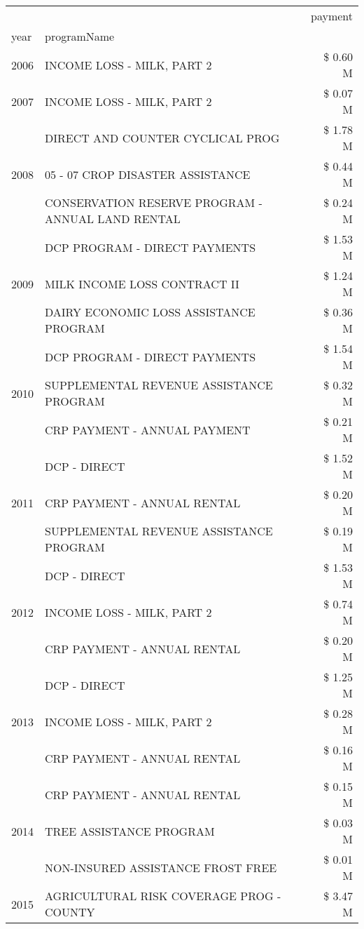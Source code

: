 \begin{tabular}{llr}
\toprule
 &  & payment \\
year & programName &  \\
\midrule
2006 & INCOME LOSS - MILK, PART 2 & \$ 0.60 M \\
\cline{1-3}
2007 & INCOME LOSS - MILK, PART 2 & \$ 0.07 M \\
\cline{1-3}
\multirow[t]{3}{*}{2008} & DIRECT AND COUNTER CYCLICAL PROG & \$ 1.78 M \\
 & 05 - 07 CROP DISASTER ASSISTANCE & \$ 0.44 M \\
 & CONSERVATION RESERVE PROGRAM - ANNUAL LAND RENTAL & \$ 0.24 M \\
\cline{1-3}
\multirow[t]{3}{*}{2009} & DCP PROGRAM - DIRECT PAYMENTS & \$ 1.53 M \\
 & MILK INCOME LOSS CONTRACT II & \$ 1.24 M \\
 & DAIRY ECONOMIC LOSS ASSISTANCE PROGRAM & \$ 0.36 M \\
\cline{1-3}
\multirow[t]{3}{*}{2010} & DCP PROGRAM - DIRECT PAYMENTS & \$ 1.54 M \\
 & SUPPLEMENTAL REVENUE ASSISTANCE PROGRAM & \$ 0.32 M \\
 & CRP PAYMENT - ANNUAL PAYMENT & \$ 0.21 M \\
\cline{1-3}
\multirow[t]{3}{*}{2011} & DCP - DIRECT & \$ 1.52 M \\
 & CRP PAYMENT - ANNUAL RENTAL & \$ 0.20 M \\
 & SUPPLEMENTAL REVENUE ASSISTANCE PROGRAM & \$ 0.19 M \\
\cline{1-3}
\multirow[t]{3}{*}{2012} & DCP - DIRECT & \$ 1.53 M \\
 & INCOME LOSS - MILK, PART 2 & \$ 0.74 M \\
 & CRP PAYMENT - ANNUAL RENTAL & \$ 0.20 M \\
\cline{1-3}
\multirow[t]{3}{*}{2013} & DCP - DIRECT & \$ 1.25 M \\
 & INCOME LOSS - MILK, PART 2 & \$ 0.28 M \\
 & CRP PAYMENT - ANNUAL RENTAL & \$ 0.16 M \\
\cline{1-3}
\multirow[t]{3}{*}{2014} & CRP PAYMENT - ANNUAL RENTAL & \$ 0.15 M \\
 & TREE ASSISTANCE PROGRAM & \$ 0.03 M \\
 & NON-INSURED ASSISTANCE FROST FREE & \$ 0.01 M \\
\cline{1-3}
\multirow[t]{3}{*}{2015} & AGRICULTURAL RISK COVERAGE PROG - COUNTY & \$ 3.47 M \\

\end{tabular}
